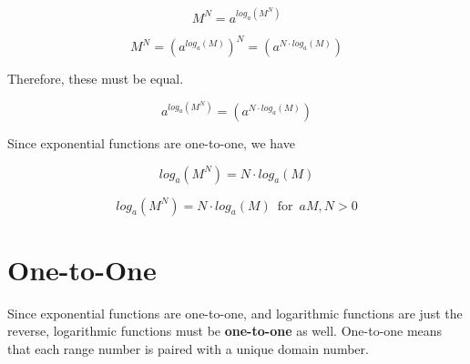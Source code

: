 \documentclass{ximera}
\begin{document}
\[   M^N = a^{log_a(M^N)}                  \]

\[   M^N = (a^{log_a(M)})^N =     (a^{N \cdot log_a(M)})             \]


Therefore, these must be equal.


\[    a^{log_a(M^N)}      =    (a^{N \cdot log_a(M)})                \]





Since exponential functions are one-to-one, we have 


\[    log_a(M^N)    =   N \cdot log_a(M)            \]








\begin{template} 

\[    log_a(M^N)    =   N \cdot log_a(M)       \, \text{ for } \, a M, N  > 0        \]


\end{template}


















\section{One-to-One}







Since exponential functions are one-to-one, and logarithmic functions are just the reverse, logarithmic functions must be \textbf{one-to-one} as well. One-to-one means that each range number is paired with a unique domain number.
\end{document}
